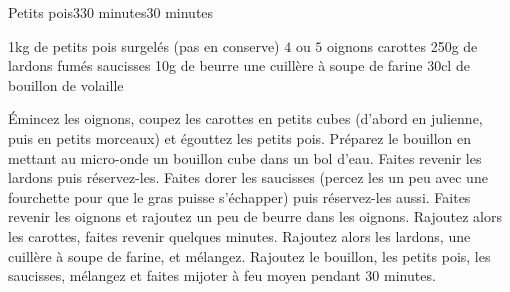 \begin{recette}{Petits pois}{3}{30 minutes}{30 minutes}
\begin{ingredients}
\ingredient 1kg de petits pois surgelés (pas en conserve)
\ingredient $4$ ou $5$ oignons
 carottes
\ingredient 250g de lardons fumés
 saucisses
\ingredient 10g de beurre
\ingredient une cuillère à soupe de farine
\ingredient 30cl de bouillon de volaille
\end{ingredients}

\begin{preparation}
\etape Émincez les oignons, coupez les carottes en petits cubes (d'abord en julienne, puis en petits morceaux) et égouttez les petits pois. Préparez le bouillon en mettant au micro-onde un bouillon cube dans un bol d'eau.
\etape Faites revenir les lardons puis réservez-les. Faites dorer les saucisses (percez les un peu avec une fourchette pour que le gras puisse s'échapper) puis réservez-les aussi.
\etape Faites revenir les oignons et rajoutez un peu de beurre dans les oignons.
\etape Rajoutez alors les carottes, faites revenir quelques minutes.
\etape Rajoutez alors les lardons, une cuillère à soupe de farine, et mélangez.
\etape Rajoutez le bouillon, les petits pois, les saucisses, mélangez et faites mijoter à feu moyen pendant 30 minutes.
\end{preparation}

\end{recette}

